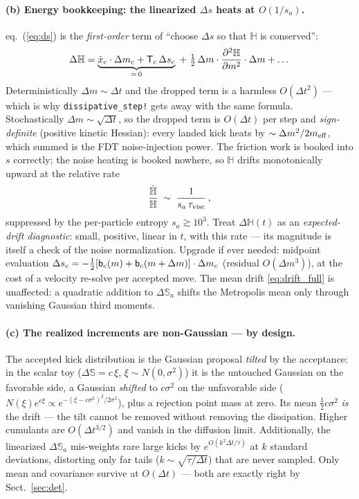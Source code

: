 \documentclass[12pt,aps,preprint,nofootinbib,noshowkeys,noshowpacs,longbibliography,superscriptaddress,tightenlines]{revtex4-2}
\def\Sbb{{\mathbb S}}
\def\bbeta{{\sf b}}
\def\Teff{{\sf T}}
\def\Eq#1{eq.~(\ref{#1})}
\def\Sect#1{Sect.~\ref{#1}}
\def\st{\begin{equation}}
\def\stp{\end{equation}}
\begin{document}
\paragraph{(b) Energy bookkeeping: the linearized $\Delta s$ heats at
$O(1/s_a)$.}
\Eq{eq:ds} is the \emph{first-order} term of ``choose $\Delta s$ so that
$\mathbb H$ is conserved'':
\st
\Delta\mathbb H
 = \underbrace{\dot x_c\cdot\Delta m_c + \Teff_c\,\Delta s_c}_{=\,0}
 \;+\; \tfrac12\,\Delta m\cdot\frac{\partial^2\mathbb H}{\partial m^2}
 \cdot\Delta m + \dots
\stp
Deterministically $\Delta m\sim\Delta t$ and the dropped term is a harmless
$O(\Delta t^2)$ --- which is why \texttt{dissipative\_step!} gets away with
the same formula.  Stochastically $\Delta m\sim\sqrt{\Delta t}$, so the
dropped term is $O(\Delta t)$ per step and \emph{sign-definite} (positive
kinetic Hessian): every landed kick heats by $\sim\Delta m^2/2m_{\rm eff}$,
which summed is the FDT noise-injection power.  The friction work is booked
into $s$ correctly; the noise heating is booked nowhere, so $\mathbb H$
drifts monotonically upward at the relative rate
\st
\frac{\dot{\mathbb H}}{\mathbb H}\;\sim\;\frac{1}{s_a\,\tau_{\rm visc}}\,,
\stp
suppressed by the per-particle entropy $s_a\gtrsim10^3$.  Treat
$\Delta\mathbb H(t)$ as an \emph{expected-drift diagnostic}: small, positive,
linear in $t$, with this rate --- its magnitude is itself a check of the
noise normalization.  Upgrade if ever needed: midpoint evaluation
$\Delta s_c = -\tfrac12[\bbeta_c(m)+\bbeta_c(m+\Delta m)]\cdot\Delta m_c$
(residual $O(\Delta m^3)$), at the cost of a velocity re-solve per accepted
move.  The mean drift \eqref{eq:drift_full} is unaffected: a quadratic
addition to $\Delta\Sbb_a$ shifts the Metropolis mean only through vanishing
Gaussian third moments.

\paragraph{(c) The realized increments are non-Gaussian --- by design.}
The accepted kick distribution is the Gaussian proposal \emph{tilted} by the
acceptance: in the scalar toy ($\Delta\Sbb=c\,\xi$, $\xi\sim N(0,\sigma^2)$)
it is the untouched Gaussian on the favorable side, a Gaussian \emph{shifted}
to $c\sigma^2$ on the unfavorable side ($N(\xi)e^{c\xi}\propto
e^{-(\xi-c\sigma^2)^2/2\sigma^2}$), plus a rejection point mass at zero.  Its
mean $\tfrac12 c\sigma^2$ \emph{is} the drift --- the tilt cannot be removed
without removing the dissipation.  Higher cumulants are $O(\Delta t^{3/2})$
and vanish in the diffusion limit.  Additionally, the linearized
$\Delta\Sbb_a$ mis-weights rare large kicks by $e^{O(k^2\Delta t/\tau)}$ at
$k$ standard deviations, distorting only far tails
($k\sim\sqrt{\tau/\Delta t}$) that are never sampled.  Only mean and
covariance survive at $O(\Delta t)$ --- both are exactly right by
\Sect{sec:det}.
\end{document}

